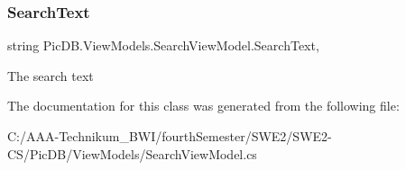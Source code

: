 \subsubsection{\texorpdfstring{Search\+Text}{SearchText}}
{\footnotesize\ttfamily string Pic\+D\+B.\+View\+Models.\+Search\+View\+Model.\+Search\+Text\hspace{0.3cm}{\ttfamily [get]}, {\ttfamily [set]}}



The search text 



The documentation for this class was generated from the following file\+:\begin{DoxyCompactItemize}
\item 
C\+:/\+A\+A\+A-\/\+Technikum\+\_\+\+B\+W\+I/fourth\+Semester/\+S\+W\+E2/\+S\+W\+E2-\/\+C\+S/\+Pic\+D\+B/\+View\+Models/Search\+View\+Model.\+cs\end{DoxyCompactItemize}
